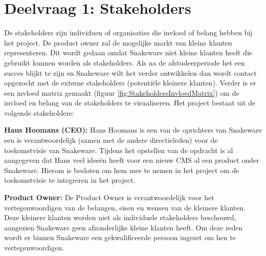 \section{Deelvraag 1: Stakeholders}
De stakeholders zijn individuen of organisaties die invloed of belang hebben bij het project.
De product owner zal de mogelijke markt van kleine klanten representeren.
Dit wordt gedaan omdat Snakeware niet kleine klanten heeft die gebruikt kunnen worden als stakeholders.
Als na de afstudeerperiode het een succes blijkt te zijn en Snakeware wilt het verder ontwikkelen dan wordt contact opgezocht met de externe stakeholders (potentiële kleinere klanten). 
Verder is er een invloed matrix gemaakt (figuur \ref{fig:StakeholdersInvloedMatrix}) om de invloed en belang van de stakeholders te visualiseren. 
Het project bestaat uit de volgende stakeholders:

\whitespace
\textbf{Hans Hoomans (CEO):}
Hans Hoomans is een van de oprichters van Snakeware een is verantwoordelijk (samen met de andere directieleden) voor de toekomstvisie van Snakeware.
Tijdens het opstellen van de opdracht is al aangegeven dat Hans veel ideeën heeft voor een nieuw \gls{CMS} al een product onder Snakeware.
Hierom is besloten om hem mee te nemen in het project om de toekomstvisie te integreren in het project.

\whitespace
\textbf{Product Owner:}
De Product Owner is verantwoordelijk voor het vertegenwoordigen van de belangen, eisen en wensen van de kleinere klanten.
Deze kleinere klanten worden niet als individuele stakeholders beschouwd, aangezien Snakeware geen afzonderlijke kleine klanten heeft.
Om deze reden wordt er binnen Snakeware een gekwalificeerde persoon ingezet om hen te vertegenwoordigen.

